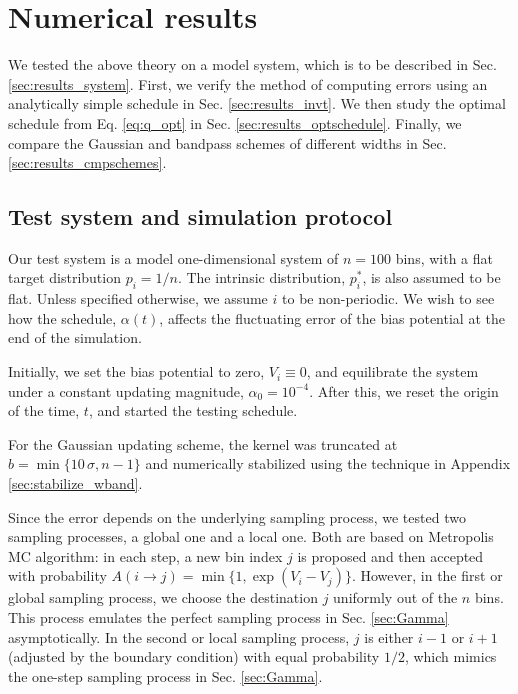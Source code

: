 \documentclass[reprint, floatfix]{revtex4-1}
\begin{document}
\section{\label{sec:results}
Numerical results}



We tested the above theory on a model system,
which is to be described in Sec. \ref{sec:results_system}.
%
First, we verify the method of computing errors
using an analytically simple schedule
in Sec. \ref{sec:results_invt}.
%
We then study the optimal schedule from
Eq. \eqref{eq:q_opt}
in Sec. \ref{sec:results_optschedule}.
%
Finally, we compare the Gaussian and
bandpass schemes of different widths
in Sec. \ref{sec:results_cmpschemes}.


\subsection{\label{sec:results_system}
Test system and simulation protocol}


Our test system is
a model one-dimensional system
of $n = 100$ bins,
with a flat target distribution
$p_i = 1/n$.
%
The intrinsic distribution, $p^*_i$,
is also assumed to be flat.
%
Unless specified otherwise,
we assume $i$ to be non-periodic.
%
We wish to see how
the schedule, $\alpha(t)$,
affects the fluctuating error
of the bias potential
at the end of the simulation.



Initially,
we set the bias potential to zero,
$V_i \equiv 0$,
%
and equilibrate the system under
a constant updating magnitude,
$\alpha_0 = 10^{-4}$.
%
After this,
we reset the origin of the time, $t$,
and started the testing schedule.


For the Gaussian updating scheme,
the kernel was truncated at
$b = \min\{10 \, \sigma, n - 1\}$
and numerically stabilized
using the technique
in Appendix \ref{sec:stabilize_wband}.



Since the error depends on
the underlying sampling process,
we tested two sampling processes,
a global one and a local one.
%
Both are based on
Metropolis MC algorithm\cite{
  metropolis1953, newman, frenkel,
  landau_binder}:
%
in each step, a new bin index $j$ is proposed
and then accepted with probability
%
$
A(i \to j) = \min\{ 1, \exp(V_i - V_j) \}.
$
However,
in the first or global sampling process,
we choose the destination $j$
uniformly out of the $n$ bins.
%
This process
emulates the perfect sampling process
in Sec. \ref{sec:Gamma} asymptotically.
%
In the second or local sampling process,
$j$ is either $i - 1$ or $i + 1$
(adjusted by the boundary condition)
with equal probability $1/2$,
which mimics the one-step sampling process
in Sec. \ref{sec:Gamma}.
%
\end{document}
